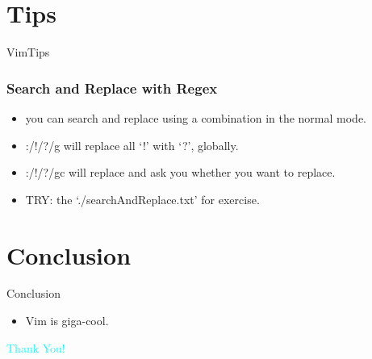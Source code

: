 \documentclass{beamer}
\begin{document}
\section{Tips}
\begin{frame}{VimTips}
    \frametitle{Search and Replace with Regex}
    \begin{itemize}
        \item you can search and replace using a combination in the normal mode.
        \item \textsf{:/!/?/g} will replace all `!' with `?', globally.
        \item \textsf{:/!/?/gc} will replace and ask you whether you want to replace.
        \item TRY: the `./searchAndReplace.txt' for exercise.
    \end{itemize}
\end{frame}

\section{Conclusion}
\begin{frame}{Conclusion}
    \begin{itemize}
        \item Vim is giga-cool.
    \end{itemize}
\end{frame}

\begin{frame}
    \centering
    {\Huge \textcolor{cyan}{Thank You!}}
\end{frame}
\end{document}

